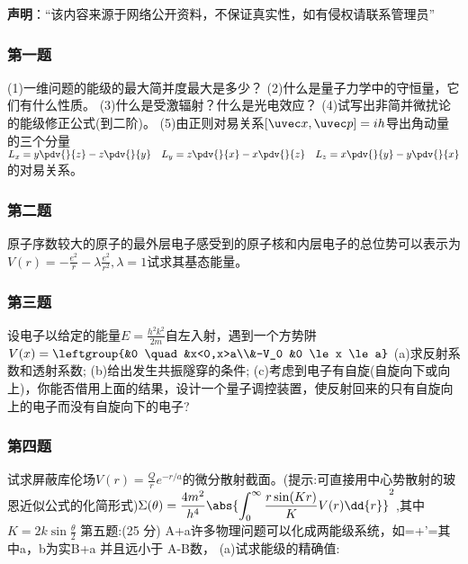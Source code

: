 


\textbf{声明}：“该内容来源于网络公开资料，不保证真实性，如有侵权请联系管理员”

\subsubsection{第一题}
(1)一维问题的能级的最大简并度最大是多少？
(2)什么是量子力学中的守恒量，它们有什么性质。
(3)什么是受激辐射？什么是光电效应？
(4)试写出非简并微扰论的能级修正公式(到二阶)。
(5)由正则对易关系$[\uvec x,\uvec p]=ih$导出角动量的三个分量$\displaystyle L_x=y\pdv{}{z}-z\pdv{}{y}  \quad L_y=z\pdv{}{x}-x\pdv{}{z} \quad L_z=x\pdv{}{y}-y\pdv{}{x}$
的对易关系。
\subsubsection{第二题}
原子序数较大的原子的最外层电子感受到的原子核和内层电子的总位势可以表示为$\displaystyle V(r)=-\frac{e^2}{r}-\lambda\frac{e^2}{r^2},\lambda=1$试求其基态能量。
\subsubsection{第三题}
设电子以给定的能量$E=\frac{h^2k^2}{2m}$自左入射，遇到一个方势阱$V(x)=\leftgroup{&0 \quad &x<0,x>a\\&-V_0 &0 \le x \le a}$
(a)求反射系数和透射系数;
(b)给出发生共振隧穿的条件;
(c)考虑到电子有自旋(自旋向下或向上)，你能否借用上面的结果，设计一个量子调控装置，使反射回来的只有自旋向上的电子而没有自旋向下的电子?
\subsubsection{第四题}
试求屏蔽库伦场$V(r)=\frac{Q}{r}e^{-r/a} $的微分散射截面。(提示:可直接用中心势散射的玻恩近似公式的化简形式)$\displaystyle \Sigma(\theta)=\frac{4m^2}{h^4}\abs{\int_{0}^{\infty}\frac{r\sin(Kr)}{K}V(r)\dd{r}}^2$,其中$\displaystyle K=2k\sin \frac{\theta}{2}$
第五题:(25 分)
A+a许多物理问题可以化成两能级系统，如=+'=其中a，b为实B+a
并且远小于 A-B数，
(a)试求能级的精确值:
